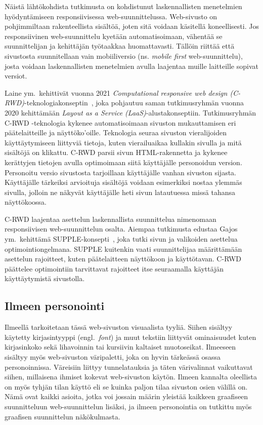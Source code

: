 \documentclass[finnish, 12pt, a4paper, elec, utf8, a-1b, online]{aaltothesis}
\begin{document}
Näistä lähtökohdista tutkimusta on kohdistunut laskennallisten menetelmien
hyödyntämiseen responsiivisessa web-suunnittelussa. Web-sivusto on pohjimmiltaan
rakenteellista sisältöä, joten sitä voidaan käsitellä koneellisesti. Jos
responsiivinen web-suunnittelu kyetään automatisoimaan, vähentää se
suunnittelijan ja kehittäjän työtaakkaa huomattavasti. Tällöin riittää että
sivustosta suunnitellaan vain mobiiliversio (ns. \textit{mobile first}
web-suunnittelu), josta voidaan laskennallisten menetelmien avulla laajentaa
muille laitteille sopivat versiot.

Laine ym.~kehittivät vuonna 2021 \textit{Computational responsive web design
    (C-RWD)}-teknologiakonseptin~\cite{laine2021responsive}, joka pohjautuu saman
tutkimusryhmän vuonna 2020 kehittämään \textit{Layout as a Service
    (LaaS)}-alustakonseptiin. Tutkimusryhmän C-RWD -teknologia kykenee
automatisoimaan sivuston mukauttamisen eri päätelaitteille ja näyttöko'oille.
Teknologia seuraa sivuston vieralijoiden käyttäytymiseen liittyviä tietoja,
kuten vierailuaikaa kullakin sivulla ja mitä sisältöjä on klikattu. C-RWD parsii
sivun HTML-rakennetta ja kykenee kerättyjen tietojen avulla optimoimaan siitä
käyttäjälle personoidun version. Personoitu versio sivustosta tarjoillaan
käyttäjälle vanhan sivuston sijasta. Käyttäjälle tärkeiksi arvioituja sisältöjä
voidaan esimerkiksi nostaa ylemmäs sivulla, jolloin ne näkyvät käyttäjälle heti
sivun latautuessa missä tahansa näyttökoossa.

C-RWD laajentaa asettelun laskennallista suunnittelua nimenomaan responsiivisen
web-suunnittelun osalta. Aiempaa tutkimusta edustaa Gajos ym.~kehittämä
SUPPLE-konsepti~\cite{10.1145/964442.964461}, joka tutki sivun ja valikoiden
asettelua optimointiongelmana. SUPPLE kuitenkin vaati suunnittelijaa
määrittämään asettelun rajoitteet, kuten päätelaitteen näyttökoon ja
käyttötavan. C-RWD päättelee optimointiin tarvittavat rajoitteet itse
seuraamalla käyttäjän käyttäytymistä sivustolla.

\subsection{Ilmeen personointi}

Ilmeellä tarkoitetaan tässä web-sivuston visuaalista tyyliä. Siihen sisältyy
käytetty kirjasintyyppi (engl.~\textit{font}) ja muut tekstiin liittyvät
ominaisuudet kuten kirjasinkoko sekä lihavoinnin tai kursiivin kaltaiset
muotoseikat. Ilmeeseen sisältyy myös web-sivuston väripaletti, joka on hyvin
tärkeässä osassa personoinnissa. Väreisiin liittyy tunnelatauksia ja täten
värivalinnat vaikuttavat siihen, millaisena ihmiset kokevat web-sivuston käytön.
Ilmeen kannalta oleellista on myös tyhjän tilan käyttö eli se kuinka paljon
tilaa sivuston osien välillä on. Nämä ovat kaikki asioita, jotka voi jossain
määrin yleistää kaikkeen graafiseen suunnitteluun web-suunnittelun lisäksi, ja
ilmeen personointia on tutkittu myös graafisen suunnittelun näkökulmasta.
\end{document}

